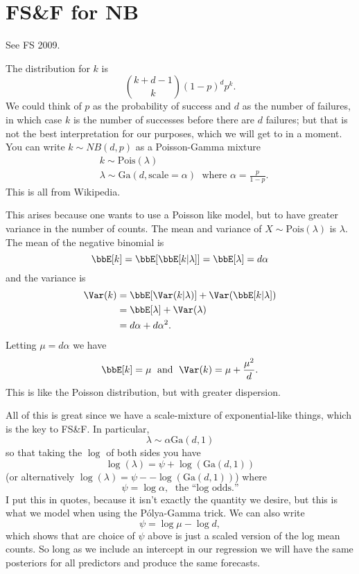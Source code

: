 \documentclass{article}
\newcommand{\Polya}{P\'{o}lya}
\begin{document}
\section*{FS\&F for NB}

See FS 2009.

The distribution for $k$ is
\[
{k+d-1 \choose k} (1-p)^d p^k.
\]
We could think of $p$ as the probability of success and $d$ as the number of
failures, in which case $k$ is the number of successes before there are $d$
failures; but that is not the best interpretation for our purposes, which we
will get to in a moment.  You can write $k \sim NB(d, p)$ as a Poisson-Gamma
mixture
\begin{align*}
& k \sim \text{Pois}(\lambda) \\
& \lambda \sim \text{Ga}(d, \text{scale}=\alpha) \; \text{ where } \alpha = \frac{p}{1-p}.
\end{align*}
This is all from Wikipedia.  

This arises because one wants to use a Poisson like model, but to have greater
variance in the number of counts.  The mean and variance of $X \sim
\text{Pois}(\lambda)$ is $\lambda$.  The mean of the negative binomial is
\[
\bbE[k] = \bbE[\bbE[k|\lambda]] = \bbE[\lambda] = d \alpha
\]
and the variance is
\begin{align*}
\Var(k) & = \bbE[\Var(k|\lambda)] + \Var(\bbE[k|\lambda]) \\
& = \bbE[\lambda] + \Var(\lambda) \\
& = d \alpha + d \alpha^2.
\end{align*}
Letting $\mu = d \alpha$ we have
\[
\bbE[k] = \mu \; \text{ and } \; \Var(k) = \mu + \frac{\mu^2}{d}.
\]
This is like the Poisson distribution, but with greater dispersion.

All of this is great since we have a scale-mixture of exponential-like things,
which is the key to FS\&F.  In particular,
\[
\lambda \sim \alpha \text{Ga}(d, 1)
\]
so that taking the $\log$ of both sides you have
\[
\log(\lambda) = \psi + \log(\text{Ga}(d,1))
\]
(or alternatively $\log (\lambda) = \psi - - \log(\text{Ga}(d,1))$) where
\[
\psi = \log \alpha, \; \text{ the ``log odds.''}
\]
I put this in quotes, because it isn't exactly the quantity we desire, but this
is what we model when using the \Polya-Gamma trick.  We can also write
\[
\psi = \log \mu - \log d,
\]
which shows that are choice of $\psi$ above is just a scaled version of the log
mean counts.  So long as we include an intercept in our regression we will have
the same posteriors for all predictors and produce the same forecasts.
\end{document}
